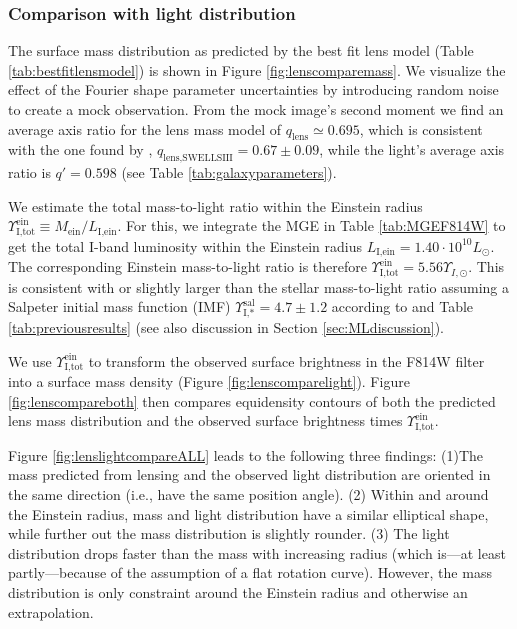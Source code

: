 \documentclass[useAMS,usenatbib]{mnras}
\begin{document}
\subsubsection{Comparison with light distribution}

The surface mass distribution as predicted by the best fit lens model (Table \ref{tab:bestfitlensmodel}) is shown in Figure \ref{fig:lenscomparemass}. We visualize the effect of the Fourier shape parameter uncertainties by introducing random noise to create a mock observation. From the mock image's second moment we find an average axis ratio for the lens mass model of $q_\text{lens} \simeq 0.695$, which is consistent with the one found by \citet{SWELLSIII}, $q_\text{lens,SWELLSIII} = 0.67 \pm 0.09$, while the light's average axis ratio is $q' = 0.598$ (see Table \ref{tab:galaxyparameters}).

We estimate the total mass-to-light ratio within the Einstein radius $\Upsilon_\text{I,tot}^\text{ein} \equiv M_\text{ein} / L_\text{I,ein}$. For this, we integrate the MGE in Table \ref{tab:MGEF814W} to get the total I-band luminosity within the Einstein radius $L_\text{I,ein} = 1.40\cdot 10^{10} L_\odot$. The corresponding Einstein mass-to-light ratio is therefore $\Upsilon_\text{I,tot}^\text{ein} = 5.56 \Upsilon_{I,\odot}$. This is consistent with or slightly larger than the stellar mass-to-light ratio assuming a Salpeter initial mass function (IMF) $\Upsilon_\text{I,*}^\text{sal} = 4.7 \pm 1.2$ according to \citet{SWELLSI} and Table \ref{tab:previousresults} (see also discussion in Section \ref{sec:MLdiscussion}).

We use $\Upsilon_\text{I,tot}^\text{ein}$ to transform the observed surface brightness in the F814W filter into a surface mass density (Figure \ref{fig:lenscomparelight}). Figure \ref{fig:lenscompareboth} then compares equidensity contours of both the predicted lens mass distribution and the observed surface brightness times $\Upsilon_\text{I,tot}^\text{ein}$.

Figure \ref{fig:lenslightcompareALL} leads to the following three findings: (1)The mass predicted from lensing and the observed light distribution are oriented in the same direction (i.e., have the same position angle). (2) Within and around the Einstein radius, mass and light distribution have a similar elliptical shape, while further out the mass distribution is slightly rounder. (3) The light distribution drops faster than the mass with increasing radius (which is---at least partly---because of the assumption of a flat rotation curve). However, the mass distribution is only constraint around the Einstein radius and otherwise an extrapolation. 
\end{document}
